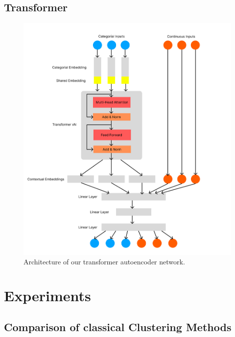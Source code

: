 \section{Transformer}

\begin{figure}
	\includegraphics[width=1.2\linewidth]{transformer_autoencoder.png}
	\caption{Architecture of our transformer autoencoder network.}
	\label{transformer_autoencoder}
\end{figure}






\chapter{Experiments} \label{Experiments}

\section{Comparison of classical Clustering Methods}

